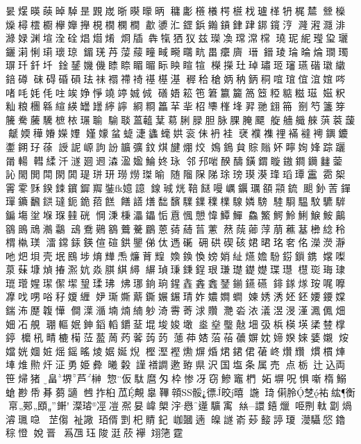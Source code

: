 𣆂𤋉暎𦴤晫䮓昰𧡰𡷫晣𣋒𣋡昞
𥡲㣑𣠺𣞼㮙𣞢𣏾瓐㮖𤘪梶㯄
檾𣟕𤒇樳橒櫉欅𡤒攑梘橌㯗橺
歗𣿀𣲚鎠鋲𨯪𨫋銉𨀞𨧜鑧涥
漋𣽿㶏渄𤀼娽渊塇洤硂焻𤌚𤉶
烱牐犇犔𤞏𤜥兹𤪤𠗫瑺𣻸𣙟
𤩊𤤗𥿡㼆㺱𤫟𨰣𣼵悧㻳瓌琼
鎇琷䒟𦷪䕑疃㽣𤳙𤴆㽘畕癳𪗆
瑨𨫌𤦫𤦎㫻㷍𤩎㻿𤧅𤣳釺圲
鍂𨫣𡡤僟𥈡𥇧睸𣈲眎眏睻𤚗
𣞁㩞𤣰琸璛㺿𤪺𤫇䃈𤪖𦆮錇𥖁
砞碍碈磒珐祙𧝁𥛣䄎禥樭𣻺
稺秴䅮𡛦䄲鈵秱𠵌𤦌𠊙𣶺𡝮㖗
啫㕰㚪𠇔𠰍竢婙𢛵𥪯𥪜娍𠉛
磰娪𥯆竾䇹籝籭䈑𥮳𥺼𥺦糍𤧹
𡞰粎籼粮檲緜縇緓罎𦉡𦅜𧭈
綗𥺂䉪𦭵𠤖柖𠁎𣗏埄𦐒𦏸翝笧
𠠬𥫩𥵃笌𥸎駦虅驣樜𣐿𤧷𦖭
騟𦖠蒕𧄧𦳑䓪脷䐂胆脉腂𦞴飃
𦩂艢艥𦩑葓𦶧蘐𧈛媆䅿𡡀嬫𡢡
嫤𡣘蚠蜨𣶏蠭𧐢娂衮佅袇袿
裦襥襍𥚃襔𧞅𧞄𨯵𨯙𨮜𨧹㺭蒣
䛵䛏㟲訽訜𩑈彍鈫𤊄旔焩烄
𡡅鵭貟賩𧷜妚矃姰㛔踪躧𤰉輰
轊䋴汘澻𢌡䢛潹溋𡟚鯩㚵𤤯
邻䢴啱䤆醻鐄𨩋䁢𨫼鐧𨰝𨰻蓥
訫閙閧閗閖𨴴瑅㻂𤣿𤩂𤏪㻧𣈥
随𨻧𨹦𨹥㻌𤧭𤩸𣿮琒瑫㻼靁
𩂰桇䨝𩂓𥟟鍨𨦉𨰦𨬯𦎾銺嬑譩
䤼珹𤈛鞛餸𠼦巁𨯅𤪲頟𩓚鋶
𩗗釥䓀𨭐𤩧𨭤飜𨩅㼀鈪䤥萔餻
饍𧬆㷽䭯馪驜𨭥𥣈檏騡嫾騯
𩣱䮐𩥈馼䮽䮗鍽塲𡌂堢𤦸𡓨硄
𢜟𣶸棅㵽鑘㤧慐𢞁𢥫愇鱏鱓
鱻鰵鰐魿鯏𩸭鮟𪇵𪃾鴡䲮𤄄鸘
䲰鴌𪆴𪃭𪃳𩤯鶥蒽𦸒𦿟𦮂藼
䔳𦶤𦺄𦷰萠藮𦸀𣟗𦁤秢𣖜𣙀𤧞
㵢鏛銾鍈𠊿碹鉷鑍俤㑀遤𥕝
砽硔碶硋𡝗𣇉𤥁㚚佲濚濙瀞
吔𤆵垻壳垊鴖埗焴㒯𤆬燫𦱀𤾗
𡞵𨩉愌嫎娋䊼𤒈㜬䭻𨧼鎻鎸
𡣖𠼝葲𦳀𡐓𤋺𢰦𤏁妔𣶷𦝁綨𦅛
𦂤𤦹𤦋𨧺鋥珢㻩璴𨭣𡢟㻡𤪳
櫘珳珻㻖𤨾𤪔𡟙𤩦𠎧𡐤𤧥瑈𤤖
炥𤥶銄珦鍟𠓾錱𨫎𨨖鎆𨯧𥗕
䤵𨪂煫𤥃𠳿嚤𠘚𠯫𠲸唂秄𡟺緾
𡛂𤩐𡡒䔮鐁㜊𨫀𤦭妰𡢿𡢃𧒄
媡㛢𣵛㚰鉟婹𨪁𡡢鍴㳍𠪴䪖㦊
僴㵩㵌𡎜煵䋻𨈘渏𩃤䓫浗𧹏
灧沯㳖𣿭𣸭渂漌㵯𠏵畑㚼㓈䚀
㻚䡱姄鉮䤾轁𨰜𦯀堒埈㛖𡑒
烾𤍢𤩱𢿣𡊰𢎽梹楧𡎘𣓥𧯴𣛟𨪃
𣟖𣏺𤲟樚𣚭𦲷萾䓟䓎𦴦𦵑𦲂
𦿞茽𡜺菭𦲀𧁓𡟛妉媂𡞳婡婱𡤅
𤇼㜭姯𡜼㛇熎鎐暚𤊥婮娫𤊓
樫𣻹𧜶𤑛𤋊焝𤉙𨧡侰𦴨峂𤓎𧹍
𤎽樌𤉖𡌄焳𤏩㶥泟勇姫彜𣌀
糓𧫴𥛶𧬘遬臶県沢国塩条属売
点栃辻込両笹㷌猪畠堺芦榊
惣仮駄麿匁枠惨冴窃鰺竈椚
妬塀呪惧噺楕鰯螥尠帋朞蒭讁
乸拃桕苽覥辠鞸顇骽徱晈暿
𧩹𤦺𠍆朎椘𧙗𥿢𧗾𢂚䣐䪸𨪚
𤀻𤩅𠗊凒𠘑妟𡺨㮾𣳿㦛𨗨𩧉㝢
𢇃譞𨭎爉𠱸𠝹軚劏煱𣽊𤪧喼
𦭒㑳𧘲䜘𤤿偦㓻𣏌䝼𨥈𡶐𧰒遖
𤾚譢嵛𦯷𡤜諪𤧶𣿯䯀𢜛鑥𥟡憕
娧晉侻𤔡乪𤤴陖涏𦲽襷𦐑筂𩃀
